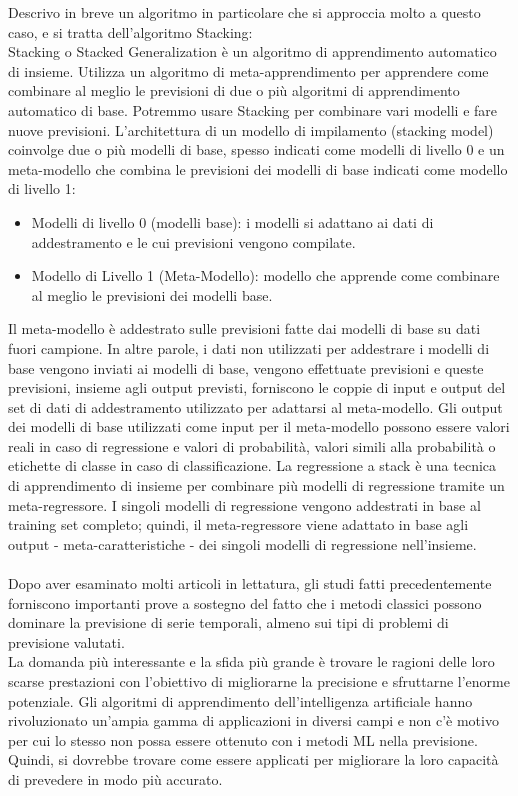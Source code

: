 \documentclass[12pt,a4paper]{report}
\begin{document}
Descrivo in breve un algoritmo in particolare che si approccia molto a questo caso, e si tratta dell'algoritmo Stacking:\\
Stacking o Stacked Generalization è un algoritmo di apprendimento automatico di insieme. Utilizza un algoritmo di meta-apprendimento per apprendere come combinare al meglio le previsioni di due o più algoritmi di apprendimento automatico di base.
Potremmo usare Stacking per combinare vari modelli e fare nuove previsioni.
L'architettura di un modello di impilamento (stacking model) coinvolge due o più modelli di base, spesso indicati come modelli di livello 0 e un meta-modello che combina le previsioni dei modelli di base indicati come modello di livello 1:
\begin{itemize}
    \item Modelli di livello 0 (modelli base): i modelli si adattano ai dati di addestramento e le cui previsioni vengono compilate.
    \item Modello di Livello 1 (Meta-Modello): modello che apprende come combinare al meglio le previsioni dei modelli base.
\end{itemize}
Il meta-modello è addestrato sulle previsioni fatte dai modelli di base su dati fuori campione. In altre parole, i dati non utilizzati per addestrare i modelli di base vengono inviati ai modelli di base, vengono effettuate previsioni e queste previsioni, insieme agli output previsti, forniscono le coppie di input e output del set di dati di addestramento utilizzato per adattarsi al meta-modello. Gli output dei modelli di base utilizzati come input per il meta-modello possono essere valori reali in caso di regressione e valori di probabilità, valori simili alla probabilità o etichette di classe in caso di classificazione.
La regressione a stack è una tecnica di apprendimento di insieme per combinare più modelli di regressione tramite un meta-regressore. I singoli modelli di regressione vengono addestrati in base al training set completo; quindi, il meta-regressore viene adattato in base agli output - meta-caratteristiche - dei singoli modelli di regressione nell'insieme.\\
\\
Dopo aver esaminato molti articoli in lettatura, gli studi fatti precedentemente forniscono importanti prove a sostegno del fatto che i metodi classici possono dominare la previsione di serie temporali, almeno sui tipi di problemi di previsione valutati.\\
La domanda più interessante e la sfida più grande è trovare le ragioni delle loro scarse prestazioni con l'obiettivo di migliorarne la precisione e sfruttarne l'enorme potenziale. Gli algoritmi di apprendimento dell'intelligenza artificiale hanno rivoluzionato un'ampia gamma di applicazioni in diversi campi e non c'è motivo per cui lo stesso non possa essere ottenuto con i metodi ML nella previsione. Quindi, si dovrebbe trovare come essere applicati per migliorare la loro capacità di prevedere in modo più accurato.
\end{document}
